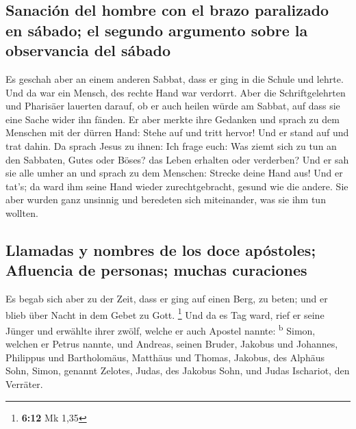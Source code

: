 \hypertarget{sanaciuxf3n-del-hombre-con-el-brazo-paralizado-en-suxe1bado-el-segundo-argumento-sobre-la-observancia-del-suxe1bado}{%
\subsection{Sanación del hombre con el brazo paralizado en sábado; el
segundo argumento sobre la observancia del
sábado}\label{sanaciuxf3n-del-hombre-con-el-brazo-paralizado-en-suxe1bado-el-segundo-argumento-sobre-la-observancia-del-suxe1bado}}

 Es geschah aber an einem anderen Sabbat, dass er ging in
die Schule und lehrte. Und da war ein Mensch, des rechte Hand war
verdorrt.  Aber die Schriftgelehrten und Pharisäer
lauerten darauf, ob er auch heilen würde am Sabbat, auf dass sie eine
Sache wider ihn fänden.  Er aber merkte ihre Gedanken und
sprach zu dem Menschen mit der dürren Hand: Stehe auf und tritt hervor!
Und er stand auf und trat dahin.  Da sprach Jesus zu
ihnen: Ich frage euch: Was ziemt sich zu tun an den Sabbaten, Gutes oder
Böses? das Leben erhalten oder verderben?  Und er sah sie
alle umher an und sprach zu dem Menschen: Strecke deine Hand aus! Und er
tat's; da ward ihm seine Hand wieder zurechtgebracht, gesund wie die
andere.  Sie aber wurden ganz unsinnig und beredeten sich
miteinander, was sie ihm tun wollten.

\hypertarget{llamadas-y-nombres-de-los-doce-apuxf3stoles-afluencia-de-personas-muchas-curaciones}{%
\subsection{Llamadas y nombres de los doce apóstoles; Afluencia de
personas; muchas
curaciones}\label{llamadas-y-nombres-de-los-doce-apuxf3stoles-afluencia-de-personas-muchas-curaciones}}

 Es begab sich aber zu der Zeit, dass er ging auf einen
Berg, zu beten; und er blieb über Nacht in dem Gebet zu Gott.
\footnote{\textbf{6:12} Mk 1,35}  Und da es Tag ward,
rief er seine Jünger und erwählte ihrer zwölf, welche er auch Apostel
nannte: \textsuperscript{b}  Simon, welchen er Petrus
nannte, und Andreas, seinen Bruder, Jakobus und Johannes, Philippus und
Bartholomäus,  Matthäus und Thomas, Jakobus, des Alphäus
Sohn, Simon, genannt Zelotes,  Judas, des Jakobus Sohn,
und Judas Ischariot, den Verräter.

